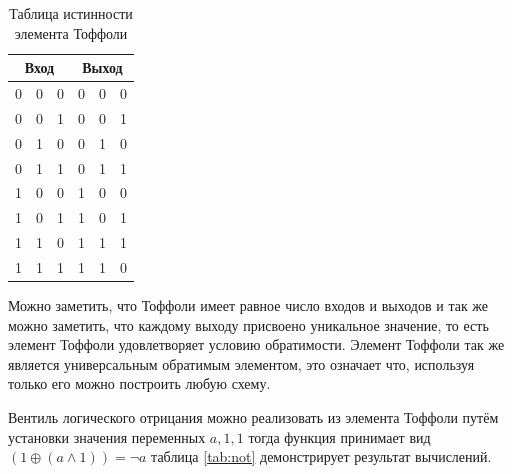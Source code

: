 \documentclass[14pt]{extarticle} %
\begin{document}
\begin{table}[h]
	\centering
	\caption{Таблица истинности элемента Тоффоли}
	\label{tab:toff}
	\begin{tabular}{|llc|lll|}
		\hline
		\multicolumn{3}{|c|}{Вход}                           & \multicolumn{3}{c|}{Выход}                          \\ \hline
		\multicolumn{1}{|l|}{0} & \multicolumn{1}{l|}{0} & 0 & \multicolumn{1}{l|}{0} & \multicolumn{1}{l|}{0} & 0 \\ \hline
		\multicolumn{1}{|l|}{0} & \multicolumn{1}{l|}{0} & 1 & \multicolumn{1}{l|}{0} & \multicolumn{1}{l|}{0} & 1 \\ \hline
		\multicolumn{1}{|l|}{0} & \multicolumn{1}{l|}{1} & 0 & \multicolumn{1}{l|}{0} & \multicolumn{1}{l|}{1} & 0 \\ \hline
		\multicolumn{1}{|l|}{0} & \multicolumn{1}{l|}{1} & 1 & \multicolumn{1}{l|}{0} & \multicolumn{1}{l|}{1} & 1 \\ \hline
		\multicolumn{1}{|l|}{1} & \multicolumn{1}{l|}{0} & 0 & \multicolumn{1}{l|}{1} & \multicolumn{1}{l|}{0} & 0 \\ \hline
		\multicolumn{1}{|l|}{1} & \multicolumn{1}{l|}{0} & 1 & \multicolumn{1}{l|}{1} & \multicolumn{1}{l|}{0} & 1 \\ \hline
		\multicolumn{1}{|l|}{1} & \multicolumn{1}{l|}{1} & 0 & \multicolumn{1}{l|}{1} & \multicolumn{1}{l|}{1} & 1 \\ \hline
		\multicolumn{1}{|l|}{1} & \multicolumn{1}{l|}{1} & 1 & \multicolumn{1}{l|}{1} & \multicolumn{1}{l|}{1} & 0 \\ \hline
	\end{tabular}
\end{table}

Можно заметить, что Тоффоли имеет равное число входов и выходов и так же можно заметить, что каждому выходу присвоено уникальное значение, то есть элемент Тоффоли удовлетворяет условию обратимости. Элемент Тоффоли так же является универсальным обратимым элементом, это означает что, используя только его можно построить любую схему.


\nocite{multiprocessing}
\nocite{pandas}



Вентиль логического отрицания можно реализовать из элемента Тоффоли путём установки значения переменных ${a, 1, 1}$ тогда функция  принимает вид $(1\oplus(a \wedge 1))=\lnot a$ таблица \ref{tab:not} демонстрирует результат вычислений.
\end{document}
